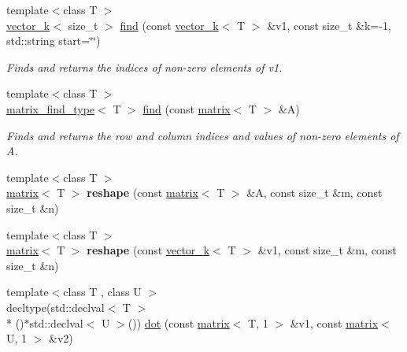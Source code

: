 \begin{DoxyCompactItemize}
\item 
\hypertarget{namespacekeycpp_afbcf6804c0bcef12904db8880c451cea}{{\footnotesize template$<$class T $>$ }\\\hyperlink{classkeycpp_1_1vector__k}{vector\-\_\-k}$<$ size\-\_\-t $>$ \hyperlink{namespacekeycpp_afbcf6804c0bcef12904db8880c451cea}{find} (const \hyperlink{classkeycpp_1_1vector__k}{vector\-\_\-k}$<$ T $>$ \&v1, const size\-\_\-t \&k=-\/1, std\-::string start=\char`\"{}\char`\"{})}\label{namespacekeycpp_afbcf6804c0bcef12904db8880c451cea}

\begin{DoxyCompactList}\small\item\em Finds and returns the indices of non-\/zero elements of v1. \end{DoxyCompactList}\item 
\hypertarget{namespacekeycpp_a97f0fc27cf8489f3f556fb1a0c975115}{{\footnotesize template$<$class T $>$ }\\\hyperlink{structkeycpp_1_1matrix__find__type}{matrix\-\_\-find\-\_\-type}$<$ T $>$ \hyperlink{namespacekeycpp_a97f0fc27cf8489f3f556fb1a0c975115}{find} (const \hyperlink{classkeycpp_1_1matrix}{matrix}$<$ T $>$ \&A)}\label{namespacekeycpp_a97f0fc27cf8489f3f556fb1a0c975115}

\begin{DoxyCompactList}\small\item\em Finds and returns the row and column indices and values of non-\/zero elements of A. \end{DoxyCompactList}\item 
\hypertarget{namespacekeycpp_a8e6462a878df6e022bd4f9aa6f953983}{{\footnotesize template$<$class T $>$ }\\\hyperlink{classkeycpp_1_1matrix}{matrix}$<$ T $>$ {\bfseries reshape} (const \hyperlink{classkeycpp_1_1matrix}{matrix}$<$ T $>$ \&A, const size\-\_\-t \&m, const size\-\_\-t \&n)}\label{namespacekeycpp_a8e6462a878df6e022bd4f9aa6f953983}

\item 
\hypertarget{namespacekeycpp_a1e3e21956e9f34310b243bc45d68b238}{{\footnotesize template$<$class T $>$ }\\\hyperlink{classkeycpp_1_1matrix}{matrix}$<$ T $>$ {\bfseries reshape} (const \hyperlink{classkeycpp_1_1vector__k}{vector\-\_\-k}$<$ T $>$ \&v1, const size\-\_\-t \&m, const size\-\_\-t \&n)}\label{namespacekeycpp_a1e3e21956e9f34310b243bc45d68b238}

\item 
\hypertarget{namespacekeycpp_a042a906d0904e670abe56e73099d6855}{{\footnotesize template$<$class T , class U $>$ }\\decltype(std\-::declval$<$ T $>$\\*
()$\ast$std\-::declval$<$ U $>$()) \hyperlink{namespacekeycpp_a042a906d0904e670abe56e73099d6855}{dot} (const \hyperlink{classkeycpp_1_1matrix}{matrix}$<$ T, 1 $>$ \&v1, const \hyperlink{classkeycpp_1_1matrix}{matrix}$<$ U, 1 $>$ \&v2)}\label{namespacekeycpp_a042a906d0904e670abe56e73099d6855}


\end{DoxyCompactItemize}

